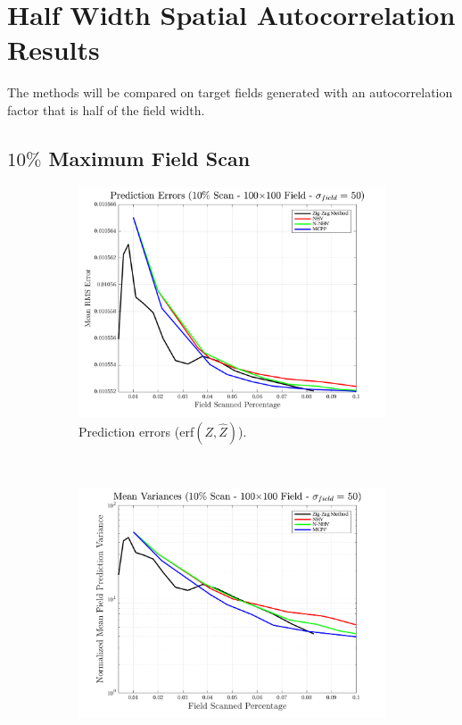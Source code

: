\section{Half Width Spatial Autocorrelation Results}
The methods will be compared on target fields generated with an autocorrelation factor that is half of the field width.

\clearpage
\subsection{$10\%$ Maximum Field Scan}
\begin{figure}[htb!]
    \centering
    \begin{subfigure}[t]{0.65\textwidth}
        \centering
        \includegraphics[width=\linewidth]{figures/hbresults/pred_errs_10p_100x100_sf_50_seed_2.png}
        \captionsetup{skip=0.20\baselineskip,size=footnotesize}
        \caption{Prediction errors (erf$(Z,\hat{Z})$).}
        \label{fig:prederrs_sigma50_p10_s2}
    \end{subfigure}%
    \\
    \begin{subfigure}[t]{0.65\textwidth}
        \centering
        \includegraphics[width=\linewidth]{figures/hbresults/vars_10p_100x100_sf_50_seed_2.png}

\end{subfigure}
\end{figure}

